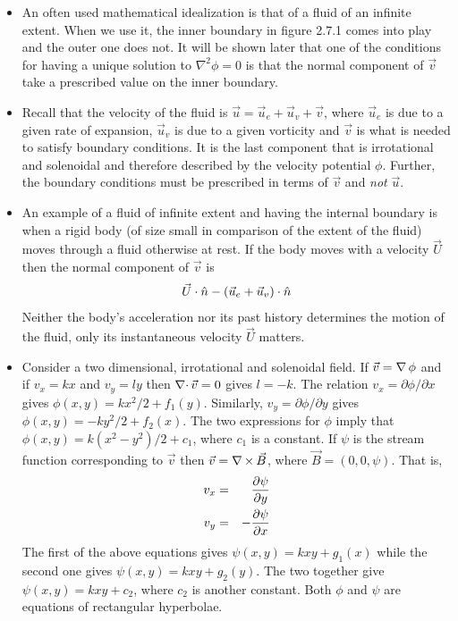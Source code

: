 \begin{itemize}
\item An often used mathematical idealization is that of a fluid of an infinite extent. When we use it, the inner boundary in figure 2.7.1 comes into play and the outer one does not. It
will be shown later that one of the conditions for having a unique solution to $\nabla^2\phi = 0$ is that the normal component of $\vec{v}$ take a prescribed value on the inner boundary.

\item Recall that the velocity of the fluid is $\vec{u} = \vec{u}_e + \vec{u}_v + \vec{v}$, where $\vec{u}_e$ is due to a given rate of expansion, $\vec{u}_v$ is due to a given vorticity
and $\vec{v}$ is what is needed to satisfy boundary conditions. It is the last component that is irrotational and solenoidal and therefore described by the velocity potential $\phi$. 
Further, the boundary conditions must be prescribed in terms of $\vec{v}$ and \emph{not} $\vec{u}$.

\item An example of a fluid of infinite extent and having the internal boundary is when a rigid body (of size small in comparison of the extent of the fluid) moves through a fluid 
otherwise at rest. If the body moves with a velocity $\vec{U}$ then the normal component of $\vec{v}$ is
\[
\vec{U}\cdot\hat{n} - (\vec{u}_e + \vec{u}_v)\cdot\hat{n}
\]
Neither the body's acceleration nor its past history determines the motion of the fluid, only its instantaneous velocity $\vec{U}$ matters.

\item Consider a two dimensional, irrotational and solenoidal field. If $\vec{v} = \operatorname{\nabla}{\phi}$ and if $v_x = kx$ and $v_y = ly$ then $\operatorname{\nabla\cdot}{\vec{v}} = 0$ gives $l = -k$. The relation
$v_x = \partial\phi/\partial x$ gives $\phi(x, y) = kx^2/2 + f_1(y)$. Similarly, $v_y = \partial\phi/\partial y$ gives $\phi(x, y) = -ky^2/2 + f_2(x)$. The two expressions for $\phi$
imply that $\phi(x, y) = k(x^2 - y^2)/2 + c_1$, where $c_1$ is a constant. If $\psi$ is the stream function corresponding to $\vec{v}$ then $\vec{v} = \operatorname{\nabla\operatorname{\times}}{\vec{B}}$, where 
$\vec{B} = (0, 0, \psi)$. That is,
\begin{eqnarray*}
v_x &=& \frac{\partial{\psi}}{\partial{y}} \\
v_y &=& -\frac{\partial{\psi}}{\partial{x}}
\end{eqnarray*}
The first of the above equations gives $\psi(x, y) = kxy + g_1(x)$ while the second one gives $\psi(x, y) = kxy + g_2(y)$. The two together give $\psi(x, y) = kxy + c_2$, where $c_2$ is
another constant. Both $\phi$ and $\psi$ are equations of rectangular hyperbolae.


\end{itemize}
